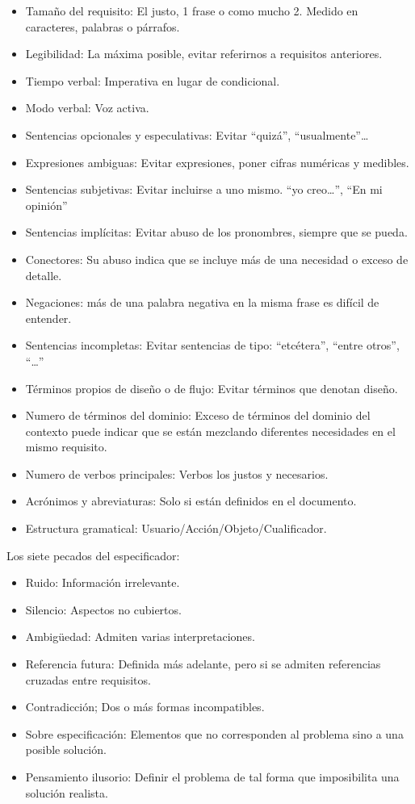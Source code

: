 \documentclass[12pt, twoside, openright]{report} %
\begin{document}
\begin{itemize}
	\item Tamaño del requisito: El justo, 1 frase o como mucho 2. Medido en
	      caracteres, palabras o párrafos.
	\item Legibilidad: La máxima posible, evitar referirnos a requisitos
	      anteriores.
	\item Tiempo verbal: Imperativa en lugar de condicional.
	\item Modo verbal: Voz activa.
	\item Sentencias opcionales y especulativas: Evitar ``quizá'',
	      ``usualmente''\ldots{}
	\item Expresiones ambiguas: Evitar expresiones, poner cifras numéricas y
	      medibles.
	\item Sentencias subjetivas: Evitar incluirse a uno mismo. ``yo
	      creo\ldots{}'', ``En mi opinión''
	\item Sentencias implícitas: Evitar abuso de los pronombres, siempre que
	      se pueda.
	\item Conectores: Su abuso indica que se incluye más de una necesidad o
	      exceso de detalle.
	\item Negaciones: más de una palabra negativa en la misma frase es
	      difícil de entender.
	\item Sentencias incompletas: Evitar sentencias de tipo: ``etcétera'',
	      ``entre otros'', ``\ldots{}''
	\item Términos propios de diseño o de flujo: Evitar términos que denotan
	      diseño.
	\item Numero de términos del dominio: Exceso de términos del dominio del
	      contexto puede indicar que se están mezclando diferentes
	      necesidades en el mismo requisito.
	\item Numero de verbos principales: Verbos los justos y necesarios.
	\item Acrónimos y abreviaturas: Solo si están definidos en el documento.
	\item Estructura gramatical: Usuario/Acción/Objeto/Cualificador.
\end{itemize}

Los siete pecados del especificador:

\begin{itemize}
	\item Ruido: Información irrelevante.
	\item Silencio: Aspectos no cubiertos.
	\item Ambigüedad: Admiten varias interpretaciones.
	\item Referencia futura: Definida más adelante, pero si se admiten
	      referencias cruzadas entre requisitos.
	\item Contradicción; Dos o más formas incompatibles.
	\item Sobre especificación: Elementos que no corresponden al problema
	      sino a una posible solución.
	\item Pensamiento ilusorio: Definir el problema de tal forma que
	      imposibilita una solución realista.
\end{itemize}
\end{document}
